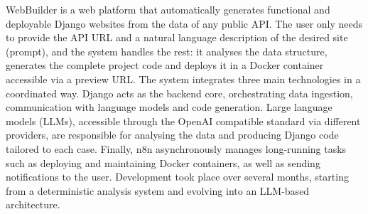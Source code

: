 WebBuilder is a web platform that automatically generates functional and deployable Django websites from the data of any public API. The user only needs to provide the API URL and a natural language description of the desired site (prompt), and the system handles the rest: it analyses the data structure, generates the complete project code and deploys it in a Docker container accessible via a preview URL.
The system integrates three main technologies in a coordinated way. Django acts as the backend core, orchestrating data ingestion, communication with language models and code generation. Large language models (LLMs), accessible through the OpenAI compatible standard via different providers, are responsible for analysing the data and producing Django code tailored to each case. Finally, n8n asynchronously manages long-running tasks such as deploying and maintaining Docker containers, as well as sending notifications to the user.
Development took place over several months, starting from a deterministic analysis system and evolving into an LLM-based architecture.